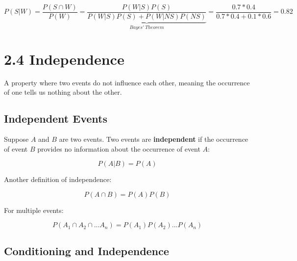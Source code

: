 \documentclass[
  letterpaper,
  DIV=11,
  numbers=noendperiod]{scrreprt}
\begin{document}
\begin{tcolorbox}[enhanced jigsaw, opacityback=0, left=2mm, breakable, bottomtitle=1mm, rightrule=.15mm, colframe=quarto-callout-tip-color-frame, titlerule=0mm, colback=white, opacitybacktitle=0.6, toptitle=1mm, title=\textcolor{quarto-callout-tip-color}{\faLightbulb}\hspace{0.5em}{Solution}, colbacktitle=quarto-callout-tip-color!10!white, bottomrule=.15mm, arc=.35mm, coltitle=black, leftrule=.75mm, toprule=.15mm]

\[
P(S|W) = \frac{P(S \cap W)}{P(W)} = \underbrace{\frac{P(W|S)P(S)}{P(W|S)P(S) + P(W|NS)P(NS)}}_{Bayes' \ Theorem} = \frac{0.7 * 0.4}{0.7 * 0.4 + 0.1 * 0.6} = 0.82
\]

\end{tcolorbox}

\chapter{2.4 Independence}\label{independence}

\begin{tcolorbox}[enhanced jigsaw, colback=white, left=2mm, breakable, opacityback=0, bottomrule=.15mm, rightrule=.15mm, arc=.35mm, colframe=quarto-callout-note-color-frame, leftrule=.75mm, toprule=.15mm]

A property where two events do not influence each other, meaning the
occurrence of one tells us nothing about the other. 🔗

\end{tcolorbox}

\section{Independent Events}\label{independent-events}

Suppose \(A\) and \(B\) are two events. Two events are
\textbf{independent} if the occurrence of event \(B\) provides no
information about the occurrence of event \(A\):

\[ 
P(A|B) = P(A) 
\]

Another definition of independence:

\[ 
P(A \cap B) = P(A) P(B)
\]

For multiple events:

\[ 
P(A_{1} \cap A_{2} \cap ... A_{n}) = P(A_{1}) P(A_{2}) ... P(A_{n})
\]

\section{Conditioning and
Independence}\label{conditioning-and-independence}
\end{document}
